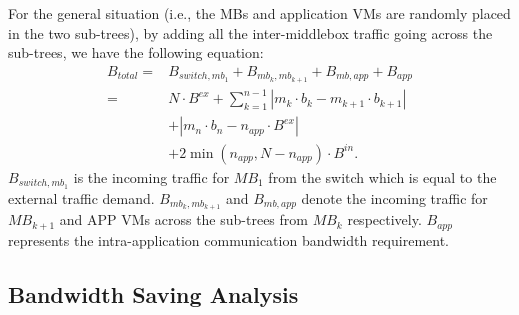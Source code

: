 \documentclass[review]{elsarticle}
\begin{document}
For the general situation (i.e., the MBs and application VMs are randomly placed in the two sub-trees), by adding all the inter-middlebox traffic going across the sub-trees, we have the following equation:
\begin{equation}
\begin{aligned}
B_{total}= &B_{switch,mb_{1}}+B_{mb_k,mb_{k+1}}+B_{mb,app}+B_{app}\\
 =&N\cdot B^{ex}+\sum\limits_{k=1}^{n-1}|m_k\cdot b_k-m_{k+1}\cdot b_{k+1}|\\
&+|m_n\cdot b_n-n_{app}\cdot B^{ex}|
\\&+2\min(n_{app}, N-n_{app})\cdot B^{in}.
\end{aligned}
\label{equ:bw_equation}
\end{equation}
%
$B_{switch,mb_1}$ is the incoming traffic for $MB_1$ from the switch which is equal to the external traffic demand. $B_{mb_k,mb_{k+1}}$ and $B_{mb,app}$ denote the incoming traffic for $MB_{k+1}$ and APP VMs across the sub-trees from $MB_k$ respectively. $B_{app}$ represents the intra-application communication bandwidth requirement.

\subsection{Bandwidth Saving Analysis}
\end{document}
